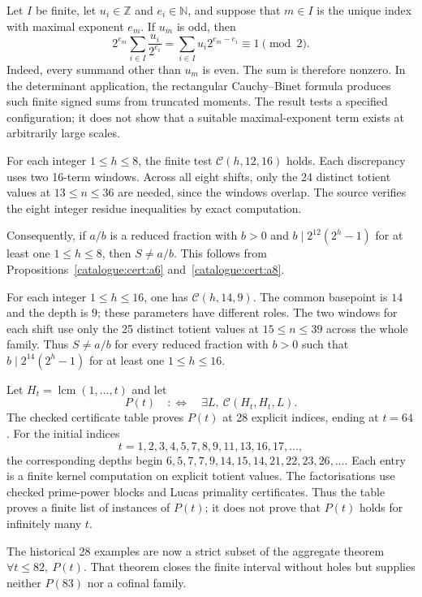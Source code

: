 \begin{prop}\label{catalogue:mob:d3}
Let $I$ be finite, let $u_i\in\mathbb Z$ and $e_i\in\mathbb N$, and
suppose that $m\in I$ is the unique index with maximal exponent $e_m$.
If $u_m$ is odd, then
\[
 2^{e_m}\sum_{i\in I}\frac{u_i}{2^{e_i}}
       =\sum_{i\in I}u_i2^{e_m-e_i}\equiv1\pmod2.
\]
Indeed, every summand other than $u_m$ is even. The sum is therefore
nonzero. In the determinant application, the rectangular
Cauchy--Binet formula produces such finite signed sums from truncated
moments. The result tests a specified configuration; it does not show
that a suitable maximal-exponent term exists at arbitrarily large scales.
\end{prop}

\begin{prop}\label{catalogue:cert:a11}
For each integer $1\le h\le8$, the finite test $\mathcal C(h,12,16)$
holds. Each discrepancy uses two 16-term windows. Across all eight
shifts, only the 24 distinct totient values at $13\le n\le36$ are
needed, since the windows overlap. The source verifies the eight
integer residue inequalities by exact computation.

Consequently, if $a/b$ is a reduced fraction with $b>0$ and
$b\mid2^{12}(2^h-1)$ for at least one $1\le h\le8$, then $S\ne a/b$.
This follows from Propositions~\ref{catalogue:cert:a6}
and~\ref{catalogue:cert:a8}.
\end{prop}

\begin{prop}\label{catalogue:cert:a12}
For each integer $1\le h\le16$, one has $\mathcal C(h,14,9)$.
The common basepoint is $14$ and the depth is $9$; these parameters
have different roles. The two windows for each shift use only the
25 distinct totient values at $15\le n\le39$ across the whole family.
Thus $S\ne a/b$ for every reduced fraction with $b>0$ such that
$b\mid2^{14}(2^h-1)$ for at least one $1\le h\le16$.
\end{prop}

\begin{prop}\label{catalogue:cert:b11}
Let $H_t=\operatorname{lcm}(1,\ldots,t)$ and let
\[
P(t)\quad:\Longleftrightarrow\quad \exists L,\ \mathcal{C}(H_t,H_t,L).
\]
The checked certificate table proves $P(t)$ at 28 explicit indices, ending at $t=64$.
For the initial indices
\[
t=1,2,3,4,5,7,8,9,11,13,16,17,\ldots,
\]
the corresponding depths begin
$6,5,7,7,9,14,15,14,21,22,23,26,\ldots$.
Each entry is a finite kernel computation on explicit totient values. The factorisations use
checked prime-power blocks and Lucas primality certificates. Thus the table proves a finite list
of instances of $P(t)$; it does not prove that $P(t)$ holds for infinitely many $t$.

The historical 28 examples are now a strict subset of the aggregate theorem
$\forall t\le82,\ P(t)$.  That theorem closes the finite interval without
holes but supplies neither $P(83)$ nor a cofinal family.
\end{prop}

